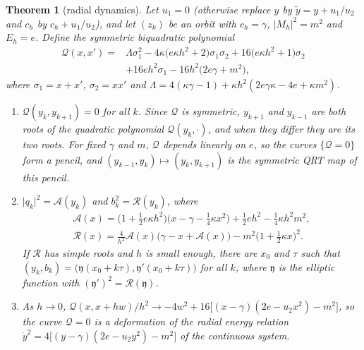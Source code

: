 \documentclass[11pt,a4paper]{article}
\newtheorem{theorem}{Theorem}[section]
\theoremstyle{definition}
\theoremstyle{remark}
\begin{document}
\begin{theorem}[radial dynamics]\label{thm:radial}
Let $u_1=0$ (otherwise replace $y$ by $\tilde y=y+u_1/u_2$ and $c_h$ by $c_h+u_1/u_2$), and let $(z_k)$ be an orbit
with $c_h=\gamma$, $\lvert M_h\rvert^2=m^2$ and $E_h=e$. Define the symmetric biquadratic polynomial
\begin{align*}
\mathcal Q(x,x')={}&\Lambda\sigma_1^2-4\kappa\big(e\kappa h^2+2\big)\sigma_1\sigma_2+16\big(e\kappa h^2+1\big)\sigma_2\\
&+16eh^2\sigma_1-16h^2\big(2e\gamma+m^2\big),
\end{align*}
where $\sigma_1=x+x'$, $\sigma_2=xx'$ and $\Lambda=4(\kappa\gamma-1)+\kappa h^2(2e\gamma\kappa-4e+\kappa m^2)$.
\begin{enumerate}[label=(\alph*)]
\item $\mathcal Q(y_k,y_{k+1})=0$ for all $k$. Since $\mathcal Q$ is symmetric, $y_{k+1}$ and $y_{k-1}$ are both
  roots of the quadratic polynomial $\mathcal Q(y_k,\cdot)$, and when they differ they are its two roots. For fixed
  $\gamma$ and $m$, $\mathcal Q$ depends linearly on $e$, so the curves $\{\mathcal Q=0\}$ form a pencil, and
  $(y_{k-1},y_k)\mapsto(y_k,y_{k+1})$ is the symmetric QRT map of this pencil.
\item $\lvert q_k\rvert^2=\mathcal A(y_k)$ and $b_k^2=\mathcal R(y_k)$, where
\begin{gather*}
\mathcal A(x)=\big(1+\tfrac12e\kappa h^2\big)\big(x-\gamma-\tfrac14\kappa x^2\big)+\tfrac12eh^2-\tfrac14\kappa h^2m^2,\\
\mathcal R(x)=\tfrac{4}{h^2}\mathcal A(x)\big(\gamma-x+\mathcal A(x)\big)-m^2\big(1+\tfrac12\kappa x\big)^2 .
\end{gather*}
  If $\mathcal R$ has simple roots and $h$ is small enough, there are $x_0$ and $\tau$ such that
  $(y_k,b_k)=\big(\mathfrak y(x_0+k\tau),\mathfrak y'(x_0+k\tau)\big)$ for all $k$, where $\mathfrak y$ is the
  elliptic function with $(\mathfrak y')^2=\mathcal R(\mathfrak y)$.
\item As $h\to0$, $\mathcal Q(x,x+hw)/h^2\to-4w^2+16\big[(x-\gamma)(2e-u_2x^2)-m^2\big]$, so the curve
  $\mathcal Q=0$ is a deformation of the radial energy relation
  $\dot y^2=4\big[(y-\gamma)(2e-u_2y^2)-m^2\big]$ of the continuous system.
\end{enumerate}
\end{theorem}
\end{document}
